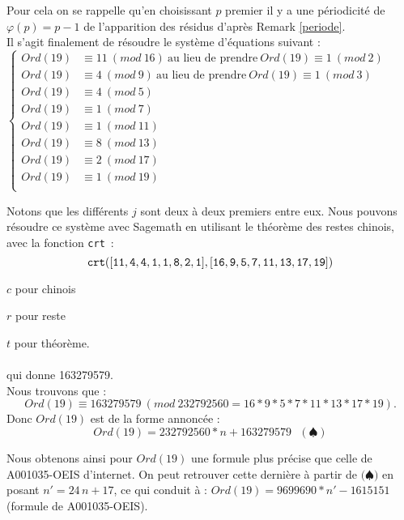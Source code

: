 \documentclass[12pt]{article}
\begin{document}
 Pour cela on se rappelle qu'en choisissant $p$ premier il y a une p\'eriodicit\'e de $\varphi(p) 
= p - 1$ de l'apparition des r\'esidus d'apr\`es Remark \ref{periode}.\\

 \noindent Il s'agit finalement de r\'esoudre le  {syst\`eme  d'\'equations} suivant :\\
 
$ \begin{cases}
Ord(19) &\equiv  11 \ (mod \ 16) \ \mbox{au lieu de prendre} \ Ord(19) \equiv  1 \ (mod \ 2)\\
Ord(19) &\equiv  4 \ (mod \ 9) \ \mbox{au lieu de prendre} \ Ord(19) \equiv  1 \ (mod \ 3)\\
Ord(19) &\equiv  4\ (mod \ 5) \\

Ord(19) &\equiv  1\ (mod \ 7) \\
Ord(19) &\equiv  1\ (mod \ 11) \\
Ord(19) &\equiv  8\ (mod \ 13) \\
Ord(19) &\equiv  2\ (mod \ 17) \\
Ord(19) &\equiv  1\ (mod \ 19) \\
\end{cases}$

Notons que les diff\'erents $j$ sont deux \`a deux premiers entre eux. Nous pouvons  
r\'esoudre ce syst\`eme avec Sagemath en utilisant le th\'eor\`eme des restes chinois, avec la fonction {\tt crt}~: 
\begin{displaymath}
\tt crt([11,4,4,1,1,8,2,1],[16,9,5,7,11,13,17,19])
\end{displaymath}

$c$ pour chinois

$r$ pour reste

$t$ pour th\'eor\`eme.\\
%
\\
qui donne 163279579. 
\\

\noindent Nous trouvons que :
$$Ord(19)  \equiv 163279579 \ (mod \ 232792560 = 16*9*5*7*11*13*17*19).$$ 
Donc $Ord(19)$ est de la forme annoncée :
$$Ord(19)=232792560*n + 163279579  \ \ \  (\spadesuit )$$




Nous obtenons ainsi pour $Ord(19)$ une formule plus pr\'ecise que celle de A001035-OEIS d'internet. On peut retrouver cette dernière à partir de $({\spadesuit)}$ en posant $n' = 24\, n + 17$, ce qui conduit à : 
$Ord(19) = 9699690*n' - 1615151$ (formule de A001035-OEIS).\\
\end{document}
